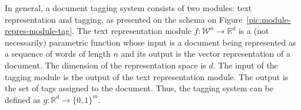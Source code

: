 \documentclass{article}
\renewcommand{\vec}[1]{\boldsymbol{#1}}
\newcommand{\bx}{\vec{x}}
\newcommand{\by}{\vec{y}}
\newcommand{\bw}{\vec{w}}
\newcommand{\calD}{\mathcal{D}}
\newcommand{\calW}{\mathcal{W}}
\newcommand\R{\mathbb{R}}   %
\newcommand{\bc}{\mathbf{c}}
\newcommand{\bd}{\mathbf{d}}
\begin{document}
In general, a document tagging system consists of two modules: text representation and tagging, as presented on the schema on Figure~\ref{pic:module-repres-module-tag}. The text representation module $f : \calW^{n} \rightarrow \R^{d}$ is a (not necessarily) parametric function whose input is a document being represented as a sequence of words of length $n$ and its output is the vector representation of a document. The dimension of the representation space is $d$. 
The input of the tagging module is the output of the text representation module. The output is the set of tags assigned to the document. Thus, the tagging system can be defined as $g: \R^{d} \rightarrow  \{ 0 , 1 \}^m$. 


%
%
%
%
\end{document}
